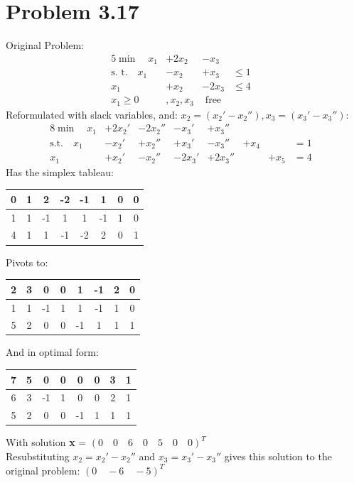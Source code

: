 \documentclass[a4paper,12pt]{article}
\begin{document}
\section*{Problem 3.17}
Original Problem:
\begin{alignat*}{5}
  \min \quad x_1& + 2x_2& - x_3& {}&\\
  \text{s. t.} \quad x_1& - x_2& + x_3& \le 1\\
  x_1& + x_2& - 2x_3& \le 4\\
  x_1 \ge 0& , x_2, x_3& \text{ free}
\end{alignat*}
Reformulated with slack variables, and: \(x_2 = (x_2' - x_2''), x_3 = (x_3' - x_3'')\):
\begin{alignat*}{8}
  \min \quad x_1& + 2x_2'& -2x_2''& - x_3'& + x_3''& {}& {}& {}&\\
  \text{s.t.} \quad x_1& - x_2'& + x_2''& + x_3'& - x_3''& + x_4& {}& = 1\\
  x_1& + x_2'& - x_2''& - 2x_3'& + 2x_3''& {}& + x_5& = 4
\end{alignat*}
Has the simplex tableau:
\begin{center}
\begin{tabular}{| c | c  c  c  c  c  c  c |}
\hline
0 & 1 & 2 & -2 & -1 & 1 & 0 & 0\\
\hline
1 & 1 & -1 & 1 & 1 & -1 & 1 & 0\\
4 & 1 & 1 & -1 & -2 & 2 & 0 & 1\\
\hline
\end{tabular}
\end{center}
Pivots to:
\begin{center}
\begin{tabular}{| c | c  c  c  c  c  c  c |}
\hline
2 & 3 & 0 & 0 & 1 & -1 & 2 & 0\\
\hline
1 & 1 & -1 & 1 & 1 & -1 & 1 & 0\\
5 & 2 & 0 & 0 & -1 & 1 & 1 & 1\\
\hline
\end{tabular}
\end{center}
And in optimal form:
\begin{center}
\begin{tabular}{| c | c  c  c  c  c  c  c |}
\hline
7 & 5 & 0 & 0 & 0 & 0 & 3 & 1\\
\hline
6 & 3 & -1 & 1 & 0 & 0 & 2 & 1\\
5 & 2 & 0 & 0 & -1 & 1 & 1 & 1\\
\hline
\end{tabular}
\end{center}
With solution {\bf x} = \( (0 \quad 0 \quad 6 \quad 0 \quad 5 \quad 0 \quad 0)^T\)\\
Resubstituting \(x_2 = x_2' - x_2''\) and \(x_3 = x_3' - x_3''\) gives this solution
to the original problem: \( (0 \quad -6 \quad -5)^T \)
\end{document}
